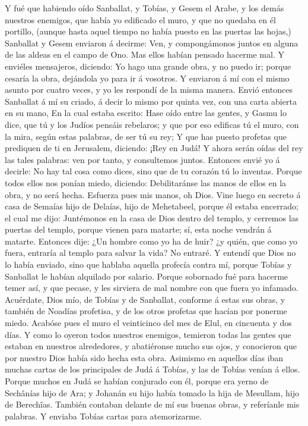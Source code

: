  Y fué que habiendo oído Sanballat, y Tobías, y Gesem el
Arabe, y los demás nuestros enemigos, que había yo edificado el muro, y
que no quedaba en él portillo, (aunque hasta aquel tiempo no había
puesto en las puertas las hojas,)  Sanballat y Gesem
enviaron á decirme: Ven, y compongámonos juntos en alguna de las aldeas
en el campo de Ono. Mas ellos habían pensado hacerme mal. 
Y enviéles mensajeros, diciendo: Yo hago una grande obra, y no puedo ir;
porque cesaría la obra, dejándola yo para ir á vosotros. 
Y enviaron á mí con el mismo asunto por cuatro veces, y yo les respondí
de la misma manera.  Envió entonces Sanballat á mí su
criado, á decir lo mismo por quinta vez, con una carta abierta en su
mano,  En la cual estaba escrito: Hase oído entre las
gentes, y Gasmu lo dice, que tú y los Judíos pensáis rebelaros; y que
por eso edificas tú el muro, con la mira, según estas palabras, de ser
tú su rey;  Y que has puesto profetas que prediquen de ti
en Jerusalem, diciendo: ¡Rey en Judá! Y ahora serán oídas del rey las
tales palabras: ven por tanto, y consultemos juntos. 
Entonces envié yo á decirle: No hay tal cosa como dices, sino que de tu
corazón tú lo inventas.  Porque todos ellos nos ponían
miedo, diciendo: Debilitaránse las manos de ellos en la obra, y no será
hecha. Esfuerza pues mis manos, oh Dios.  Vine luego en
secreto á casa de Semaías hijo de Delaías, hijo de Mehetabeel, porque él
estaba encerrado; el cual me dijo: Juntémonos en la casa de Dios dentro
del templo, y cerremos las puertas del templo, porque vienen para
matarte; sí, esta noche vendrán á matarte.  Entonces
dije: ¿Un hombre como yo ha de huir? ¿y quién, que como yo fuera,
entraría al templo para salvar la vida? No entraré.  Y
entendí que Dios no lo había enviado, sino que hablaba aquella profecía
contra mí, porque Tobías y Sanballat le habían alquilado por salario.
 Porque sobornado fué para hacerme temer así, y que
pecase, y les sirviera de mal nombre con que fuera yo infamado.
 Acuérdate, Dios mío, de Tobías y de Sanballat, conforme
á estas sus obras, y también de Noadías profetisa, y de los otros
profetas que hacían por ponerme miedo.  Acabóse pues el
muro el veinticinco del mes de Elul, en cincuenta y dos días.
 Y como lo oyeron todos nuestros enemigos, temieron todas
las gentes que estaban en nuestros alrededores, y abatiéronse mucho sus
ojos, y conocieron que por nuestro Dios había sido hecha esta obra.
 Asimismo en aquellos días iban muchas cartas de los
principales de Judá á Tobías, y las de Tobías venían á ellos.
 Porque muchos en Judá se habían conjurado con él, porque
era yerno de Sechânías hijo de Ara; y Johanán su hijo había tomado la
hija de Mesullam, hijo de Berechîas.  También contaban
delante de mí sus buenas obras, y referíanle mis palabras. Y enviaba
Tobías cartas para atemorizarme.

